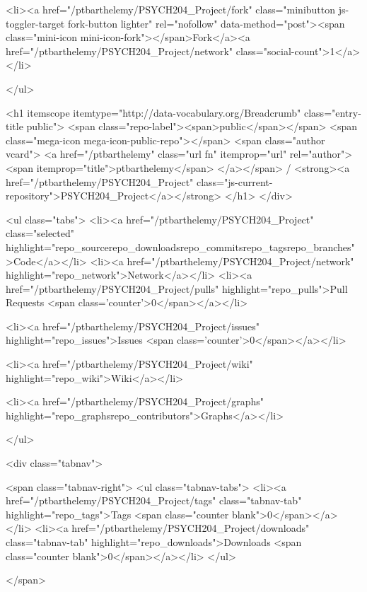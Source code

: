               <li><a href="/ptbarthelemy/PSYCH204_Project/fork" class="minibutton js-toggler-target fork-button lighter" rel="nofollow" data-method="post"><span class="mini-icon mini-icon-fork"></span>Fork</a><a href="/ptbarthelemy/PSYCH204_Project/network" class="social-count">1</a>
              </li>


    </ul>

              <h1 itemscope itemtype="http://data-vocabulary.org/Breadcrumb" class="entry-title public">
                <span class="repo-label"><span>public</span></span>
                <span class="mega-icon mega-icon-public-repo"></span>
                <span class="author vcard">
                  <a href="/ptbarthelemy" class="url fn" itemprop="url" rel="author">
                  <span itemprop="title">ptbarthelemy</span>
                  </a></span> /
                <strong><a href="/ptbarthelemy/PSYCH204_Project" class="js-current-repository">PSYCH204_Project</a></strong>
              </h1>
            </div>

            

  <ul class="tabs">
    <li><a href="/ptbarthelemy/PSYCH204_Project" class="selected" highlight="repo_sourcerepo_downloadsrepo_commitsrepo_tagsrepo_branches">Code</a></li>
    <li><a href="/ptbarthelemy/PSYCH204_Project/network" highlight="repo_network">Network</a></li>
    <li><a href="/ptbarthelemy/PSYCH204_Project/pulls" highlight="repo_pulls">Pull Requests <span class='counter'>0</span></a></li>

      <li><a href="/ptbarthelemy/PSYCH204_Project/issues" highlight="repo_issues">Issues <span class='counter'>0</span></a></li>

      <li><a href="/ptbarthelemy/PSYCH204_Project/wiki" highlight="repo_wiki">Wiki</a></li>


    <li><a href="/ptbarthelemy/PSYCH204_Project/graphs" highlight="repo_graphsrepo_contributors">Graphs</a></li>


  </ul>
  
<div class="tabnav">

  <span class="tabnav-right">
    <ul class="tabnav-tabs">
      <li><a href="/ptbarthelemy/PSYCH204_Project/tags" class="tabnav-tab" highlight="repo_tags">Tags <span class="counter blank">0</span></a></li>
      <li><a href="/ptbarthelemy/PSYCH204_Project/downloads" class="tabnav-tab" highlight="repo_downloads">Downloads <span class="counter blank">0</span></a></li>
    </ul>
    
  </span>

